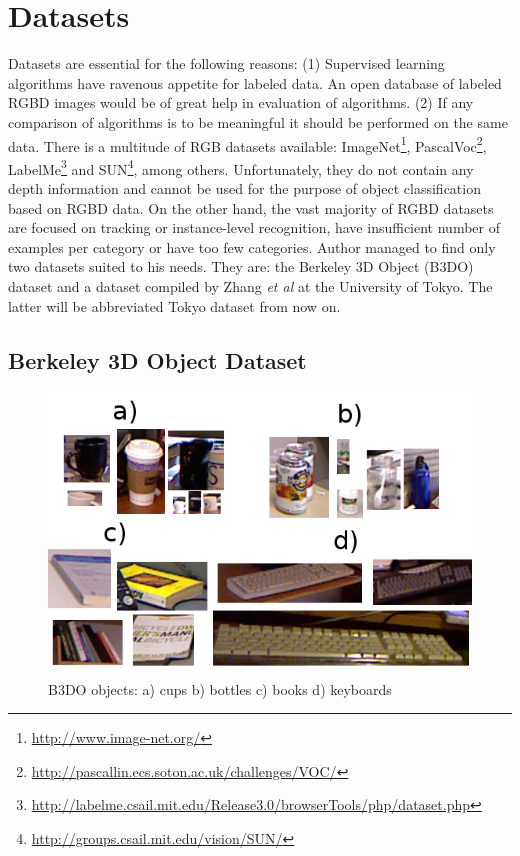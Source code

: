 \documentclass[12pt]{article}
\begin{document}
\section{ Datasets}

  Datasets are essential for the following reasons: (1) Supervised learning 
algorithms have ravenous appetite for labeled data. An open database of labeled 
RGBD images would be of great help in evaluation of algorithms. (2) If any 
comparison of algorithms is to be meaningful it should be performed on the same 
data. There is a multitude of RGB datasets available: 
ImageNet\footnote{\url{http://www.image-net.org/}}, 
PascalVoc\footnote{\url{http://pascallin.ecs.soton.ac.uk/challenges/VOC/}}, 
LabelMe\footnote{\url{
http://labelme.csail.mit.edu/Release3.0/browserTools/php/dataset.php}} and 
SUN\footnote{\url{http://groups.csail.mit.edu/vision/SUN/}}, among others. 
Unfortunately, they do not contain any depth information and cannot be used for 
the purpose of object classification based on RGBD data. On the other hand, the 
vast majority of RGBD datasets are focused on tracking or instance-level 
recognition, have insufficient number of examples per category or have too few 
categories. Author managed to find only two datasets suited to his needs. They 
are: the Berkeley 3D Object (B3DO) dataset \cite{B3DO} and a dataset compiled 
by Zhang \emph{et al} at the University of Tokyo\cite{zhangcategory}. The 
latter will be abbreviated Tokyo dataset from now on.

  \subsection{Berkeley 3D Object Dataset}
    \begin{figure}[!ht]
    \centering	
    \includegraphics[width=.75\textwidth]{../figs/b3do_objects}
    \caption{B3DO objects: a) cups b) bottles c) books d) keyboards}
    \label{fig:b3do_objects}
    \end{figure}    
    
\end{document}
